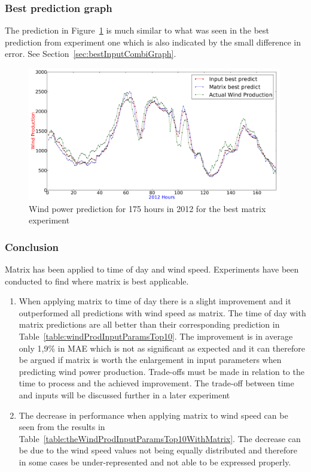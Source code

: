 \subsubsection{Best prediction graph}
The prediction in Figure~\ref{fig:bestMatrixGraph} is much similar to what was seen in the best prediction from experiment one which is also indicated by the small difference in error. See Section~\ref{sec:bestInputCombiGraph}. 

\begin{figure}[H]
\centering
\includegraphics[width=0.99\textwidth]{billeder/bestMatrixGraph.png}
\caption{Wind power prediction for 175 hours in 2012 for the best matrix experiment}
\label{fig:bestMatrixGraph}
\end{figure}   

\subsubsection{Conclusion}
Matrix has been applied to time of day and wind speed. Experiments have been conducted to find where matrix is best applicable.

\begin{enumerate}
\item When applying matrix to time of day there is a slight improvement and it outperformed all predictions with wind speed as matrix. The time of day with matrix predictions are all better than their corresponding prediction in Table~\ref{table:windProdInputParamsTop10}. The improvement is in average only 1,9\% in MAE which is not as significant as expected and it can therefore be argued if matrix is worth the enlargement in input parameters when predicting wind power production. Trade-offs must be made in relation to the time to process and the achieved improvement. The trade-off between time and inputs will be discussed further in a later experiment 
\item The decrease in performance when applying matrix to wind speed can be seen from the results in Table~\ref{table:theWindProdInputParamsTop10WithMatrix}. The decrease can be due to the wind speed values not being equally distributed and therefore in some cases be under-represented and not able to be expressed properly.  
\end{enumerate}


